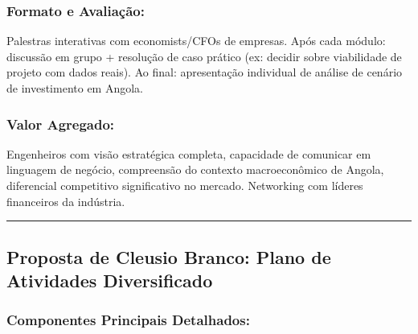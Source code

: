 \documentclass[12pt,a4paper]{article}
\begin{document}
\subsubsection*{Formato e Avaliação:}
Palestras interativas com economists/CFOs de empresas. Após cada módulo: discussão em grupo + resolução de caso prático (ex: decidir sobre viabilidade de projeto com dados reais). Ao final: apresentação individual de análise de cenário de investimento em Angola.

\subsubsection*{Valor Agregado:}
Engenheiros com visão estratégica completa, capacidade de comunicar em linguagem de negócio, compreensão do contexto macroeconômico de Angola, diferencial competitivo significativo no mercado. Networking com líderes financeiros da indústria.

\textcolor{spe-secondary}{\hspace{0.5cm}\rule{0.4\linewidth}{0.8pt}}
\subsection{Proposta de Cleusio Branco: Plano de Atividades Diversificado}

\subsubsection*{Componentes Principais Detalhados:}
\end{document}
